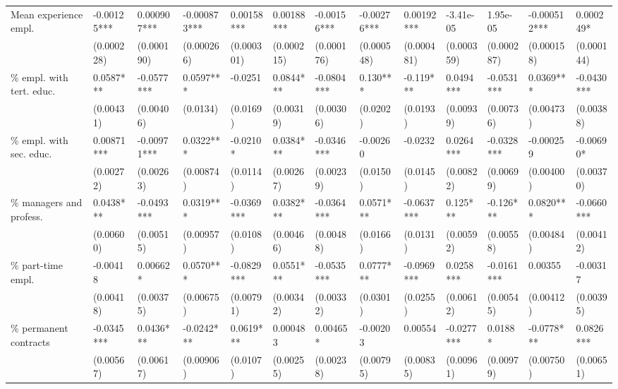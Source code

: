 \documentclass[Review,times,sageh,11pt]{sagej}
\begin{document}
\begin{sidewaystable}[htb]
{\begin{threeparttable}
\begin{tabular}{l*{12}{l}}
Mean experience empl.           &       -0.00125*** & 0.000907*** & -0.000873*** & 0.00158*** & 0.00188*** & -0.00156*** & -0.00276*** & 0.00192*** & -3.41e-05  & 1.95e-05   & -0.000512*** & 0.000249*  \\
                                &       (0.000228)  & (0.000190)  & (0.000266)   & (0.000301) & (0.000215) & (0.000176)  & (0.000548)  & (0.000481) & (0.000359) & (0.000287) & (0.000158)   & (0.000144) \\[1ex]
\% empl. with tert. educ.       &       0.0587***   & -0.0577***  & 0.0597***    & -0.0251    & 0.0844***  & -0.0804***  & 0.130***    & -0.119***  & 0.0494***  & -0.0531*** & 0.0369***    & -0.0430*** \\
                                &       (0.00431)   & (0.00406)   & (0.0134)     & (0.0169)   & (0.00319)  & (0.00306)   & (0.0202)    & (0.0193)   & (0.00939)  & (0.00736)  & (0.00473)    & (0.00388)  \\[1ex]
\% empl. with sec. educ.        &       0.00871***  & -0.00971*** & 0.0322***    & -0.0210*   & 0.0384***  & -0.0346***  & -0.00260    & -0.0232    & 0.0264***  & -0.0328*** & -0.000259    & -0.00690*  \\
                                &       (0.00272)   & (0.00263)   & (0.00874)    & (0.0114)   & (0.00267)  & (0.00239)   & (0.0150)    & (0.0145)   & (0.00822)  & (0.00699)  & (0.00400)    & (0.00370)  \\[1ex]
\% managers and profess.        &       0.0438***   & -0.0493***  & 0.0319***    & -0.0369*** & 0.0382***  & -0.0364***  & 0.0571***   & -0.0637*** & 0.125***   & -0.126***  & 0.0820***    & -0.0660*** \\
                                &       (0.00600)   & (0.00515)   & (0.00957)    & (0.0108)   & (0.00466)  & (0.00488)   & (0.0166)    & (0.0131)   & (0.00592)  & (0.00558)  & (0.00484)    & (0.00412)  \\[1ex]
\% part-time empl.              &       -0.00418    & 0.00662*    & 0.0570***    & -0.0829*** & 0.0551***  & -0.0535***  & 0.0777***   & -0.0969*** & 0.0258***  & -0.0161*** & 0.00355      & -0.00317   \\
                                &       (0.00418)   & (0.00375)   & (0.00675)    & (0.00791)  & (0.00342)  & (0.00332)   & (0.0301)    & (0.0255)   & (0.00612)  & (0.00545)  & (0.00412)    & (0.00395)  \\[1ex]
\% permanent contracts          &       -0.0345***  & 0.0436***   & -0.0242***   & 0.0619***  & 0.000483   & 0.00465*    & -0.00203    & 0.00554    & -0.0277*** & 0.0188*    & -0.0778***   & 0.0826***  \\
                                &       (0.00567)   & (0.00617)   & (0.00906)    & (0.0107)   & (0.00255)  & (0.00238)   & (0.00795)   & (0.00835)  & (0.00961)  & (0.00979)  & (0.00750)    & (0.00651)  \\[1ex]


\end{tabular}
\end{threeparttable}}
\end{sidewaystable}
\end{document}
